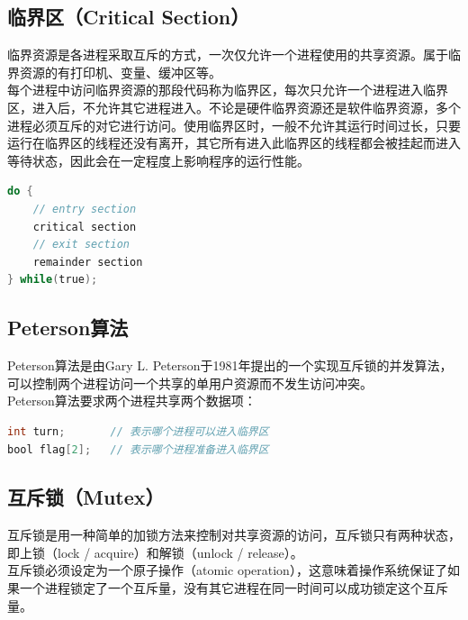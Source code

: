 \subsection{临界区（Critical Section）}

临界资源是各进程采取互斥的方式，一次仅允许一个进程使用的共享资源。属于临界资源的有打印机、变量、缓冲区等。 \\

每个进程中访问临界资源的那段代码称为临界区，每次只允许一个进程进入临界区，进入后，不允许其它进程进入。不论是硬件临界资源还是软件临界资源，多个进程必须互斥的对它进行访问。使用临界区时，一般不允许其运行时间过长，只要运行在临界区的线程还没有离开，其它所有进入此临界区的线程都会被挂起而进入等待状态，因此会在一定程度上影响程序的运行性能。 \\

\begin{lstlisting}[language=C]
do {
	// entry section
	critical section
	// exit section
	remainder section
} while(true);
\end{lstlisting}

\subsection{Peterson算法}

Peterson算法是由Gary L. Peterson于1981年提出的一个实现互斥锁的并发算法，可以控制两个进程访问一个共享的单用户资源而不发生访问冲突。 \\

Peterson算法要求两个进程共享两个数据项： \\

\begin{lstlisting}[language=C]
int turn;		// 表示哪个进程可以进入临界区
bool flag[2];	// 表示哪个进程准备进入临界区
\end{lstlisting}

\subsection{互斥锁（Mutex）}

互斥锁是用一种简单的加锁方法来控制对共享资源的访问，互斥锁只有两种状态，即上锁（lock / acquire）和解锁（unlock / release）。 \\

互斥锁必须设定为一个原子操作（atomic operation），这意味着操作系统保证了如果一个进程锁定了一个互斥量，没有其它进程在同一时间可以成功锁定这个互斥量。 \\

